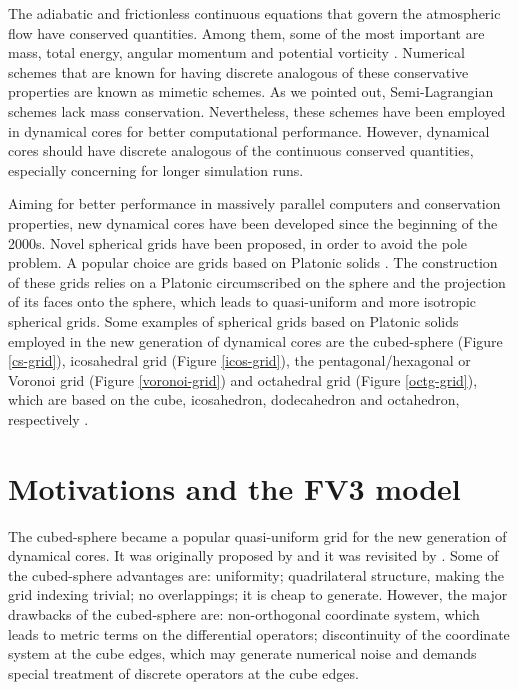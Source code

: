 The adiabatic and frictionless continuous equations that govern the atmospheric flow have 
conserved quantities. Among them, some of the most important are mass, total energy, 
angular momentum and potential vorticity \citep{thuburn:2011}.
Numerical schemes that are known for having discrete analogous of these conservative properties
are known as mimetic schemes.
As we pointed out, Semi-Lagrangian schemes lack mass conservation. Nevertheless, 
these schemes have been employed in dynamical cores for better computational performance.
However, dynamical cores should have discrete analogous of the 
continuous conserved quantities, especially concerning for longer simulation runs.

Aiming for better performance in massively parallel computers and conservation properties, 
new dynamical cores have been developed since the beginning of the 2000s.
Novel spherical grids have been proposed, in order to avoid the pole problem.
A popular choice are grids based on Platonic solids \citep{stan:2012}.
The construction of these grids relies on a Platonic circumscribed on the sphere and 
the projection of its faces onto the sphere, which leads to quasi-uniform and more isotropic
spherical grids.
Some examples of spherical grids based on Platonic solids employed in the new generation
of dynamical cores are the cubed-sphere (Figure \ref{cs-grid}), icosahedral grid (Figure \ref{icos-grid}), 
the pentagonal/hexagonal or Voronoi grid (Figure \ref{voronoi-grid}) and octahedral grid (Figure \ref{octg-grid}),
which are based on the cube, icosahedron, dodecahedron and octahedron, respectively \citep{ullrich:2017}.

\section{Motivations and the FV3 model}
The cubed-sphere became a popular quasi-uniform grid for the new generation of dynamical cores.
It was originally proposed by \citet{sadourny:1972} and it was revisited by \citet{ronchi:1996}.
Some of the cubed-sphere advantages are: uniformity; quadrilateral structure, 
making the grid indexing trivial; no overlappings; it is cheap to generate.
However, the major drawbacks of the cubed-sphere are: non-orthogonal coordinate system, which
leads to metric terms on the differential operators; discontinuity of the coordinate system
at the cube edges, which may generate numerical noise and
demands special treatment of discrete operators at the cube edges.

